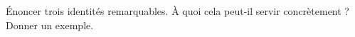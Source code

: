 %
%
\begin{tasks}
\task Énoncer trois identités remarquables.
\task À quoi cela peut-il servir concrètement ? Donner un exemple.
\end{tasks}
